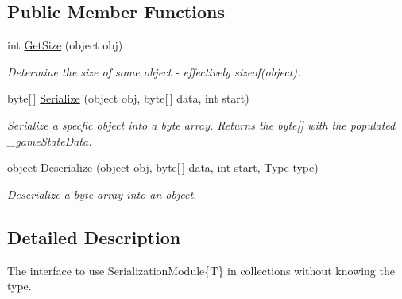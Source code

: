 \subsection*{Public Member Functions}
\begin{DoxyCompactItemize}
\item 
int \hyperlink{interface_skyrates_1_1_common_1_1_network_1_1_bit_serialize_attribute_1_1_i_serialization_module_a25a42bb4dde0dda3e028c84ad010a4ad}{Get\-Size} (object obj)
\begin{DoxyCompactList}\small\item\em Determine the size of some object -\/ effectively sizeof(object). \end{DoxyCompactList}\item 
byte\mbox{[}$\,$\mbox{]} \hyperlink{interface_skyrates_1_1_common_1_1_network_1_1_bit_serialize_attribute_1_1_i_serialization_module_abeca6d8c99338fc36671f58541001624}{Serialize} (object obj, byte\mbox{[}$\,$\mbox{]} data, int start)
\begin{DoxyCompactList}\small\item\em Serialize a specfic object into a byte array. Returns the byte\mbox{[}\mbox{]} with the populated \-\_\-game\-State\-Data. \end{DoxyCompactList}\item 
object \hyperlink{interface_skyrates_1_1_common_1_1_network_1_1_bit_serialize_attribute_1_1_i_serialization_module_a86c0048b962677a4d56693b8c7aedf81}{Deserialize} (object obj, byte\mbox{[}$\,$\mbox{]} data, int start, Type type)
\begin{DoxyCompactList}\small\item\em Deserialize a byte array into an object. \end{DoxyCompactList}\end{DoxyCompactItemize}


\subsection{Detailed Description}
The interface to use Serialization\-Module\{\-T\} in collections without knowing the type. 



